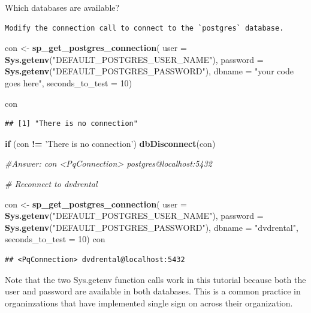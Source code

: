 \documentclass[]{book}
\newenvironment{Shaded}{\begin{snugshade}}{\end{snugshade}}
\newcommand{\CommentTok}[1]{\textcolor[rgb]{0.56,0.35,0.01}{\textit{#1}}}
\newcommand{\ControlFlowTok}[1]{\textcolor[rgb]{0.13,0.29,0.53}{\textbf{#1}}}
\newcommand{\DataTypeTok}[1]{\textcolor[rgb]{0.13,0.29,0.53}{#1}}
\newcommand{\DecValTok}[1]{\textcolor[rgb]{0.00,0.00,0.81}{#1}}
\newcommand{\KeywordTok}[1]{\textcolor[rgb]{0.13,0.29,0.53}{\textbf{#1}}}
\newcommand{\NormalTok}[1]{#1}
\newcommand{\OperatorTok}[1]{\textcolor[rgb]{0.81,0.36,0.00}{\textbf{#1}}}
\newcommand{\StringTok}[1]{\textcolor[rgb]{0.31,0.60,0.02}{#1}}
\theoremstyle{definition}
\theoremstyle{definition}
\theoremstyle{definition}
\theoremstyle{remark}
\begin{document}
Which databases are available?

\begin{verbatim}
Modify the connection call to connect to the `postgres` database.
\end{verbatim}

\begin{Shaded}
\begin{Highlighting}[]
\NormalTok{con <-}\StringTok{ }\KeywordTok{sp_get_postgres_connection}\NormalTok{(}
  \DataTypeTok{user =} \KeywordTok{Sys.getenv}\NormalTok{(}\StringTok{"DEFAULT_POSTGRES_USER_NAME"}\NormalTok{),}
  \DataTypeTok{password =}  \KeywordTok{Sys.getenv}\NormalTok{(}\StringTok{"DEFAULT_POSTGRES_PASSWORD"}\NormalTok{),}
  \DataTypeTok{dbname =} \StringTok{"your code goes here"}\NormalTok{,}
  \DataTypeTok{seconds_to_test =} \DecValTok{10}\NormalTok{)}

\NormalTok{con}
\end{Highlighting}
\end{Shaded}

\begin{verbatim}
## [1] "There is no connection"
\end{verbatim}

\begin{Shaded}
\begin{Highlighting}[]
\ControlFlowTok{if}\NormalTok{ (con }\OperatorTok{!=}\StringTok{ 'There is no connection'}\NormalTok{)}
    \KeywordTok{dbDisconnect}\NormalTok{(con)}

\CommentTok{#Answer: con <PqConnection> postgres@localhost:5432}

\CommentTok{# Reconnect to dvdrental}

\NormalTok{con <-}\StringTok{ }\KeywordTok{sp_get_postgres_connection}\NormalTok{(}
  \DataTypeTok{user =} \KeywordTok{Sys.getenv}\NormalTok{(}\StringTok{"DEFAULT_POSTGRES_USER_NAME"}\NormalTok{),}
  \DataTypeTok{password =}  \KeywordTok{Sys.getenv}\NormalTok{(}\StringTok{"DEFAULT_POSTGRES_PASSWORD"}\NormalTok{),}
  \DataTypeTok{dbname =} \StringTok{"dvdrental"}\NormalTok{,}
  \DataTypeTok{seconds_to_test =} \DecValTok{10}\NormalTok{)}
\NormalTok{con}
\end{Highlighting}
\end{Shaded}

\begin{verbatim}
## <PqConnection> dvdrental@localhost:5432
\end{verbatim}

Note that the two Sys.getenv function calls work in this tutorial
because both the user and password are available in both databases. This
is a common practice in organinzations that have implemented single sign
on across their organization.
\end{document}
